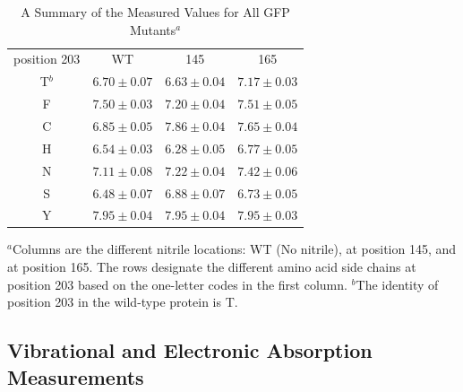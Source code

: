 \begin{table}
    \caption[Measure \pKa{} values of the GFP chromophore]{
        A Summary of the Measured \pKa{} Values for All GFP Mutants$^a$
    }
    \begin{center}
    \begin{tabular}{c|ccc}
        \toprule
        \rowcolor{lgray}
        position 203 & WT & \pCNF{} 145 & \pCNF{} 165 \\

        \cmidrule(r){1-1}\cmidrule(l){2-4}
        T$^b$ &   $ 6.70 \pm 0.07 $  &  $ 6.63 \pm 0.04 $ &  $ 7.17 \pm 0.03 $  \\
        F     &   $ 7.50 \pm 0.03 $  &  $ 7.20 \pm 0.04 $ &  $ 7.51 \pm 0.05 $  \\
        C     &   $ 6.85 \pm 0.05 $  &  $ 7.86 \pm 0.04 $ &  $ 7.65 \pm 0.04 $  \\
        H     &   $ 6.54 \pm 0.03 $  &  $ 6.28 \pm 0.05 $ &  $ 6.77 \pm 0.05 $  \\ 
        N     &   $ 7.11 \pm 0.08 $  &  $ 7.22 \pm 0.04 $ &  $ 7.42 \pm 0.06 $  \\ 
        S     &   $ 6.48 \pm 0.07 $  &  $ 6.88 \pm 0.07 $ &  $ 6.73 \pm 0.05 $  \\ 
        Y     &   $ 7.95 \pm 0.04 $  &  $ 7.95 \pm 0.04 $ &  $ 7.95 \pm 0.03 $  \\ 

        \bottomrule
    \end{tabular}
    \end{center}

    $^a$Columns are the different nitrile locations: WT (No nitrile), \pCNF{} at position 145, and \pCNF{} at position 165. The rows designate the different amino acid side chains at position 203 based on the one-letter codes in the first column. 
    $^b$The identity of position 203 in the wild-type protein is T.
    \label{tbl:pKas}
\end{table}

\subsection{Vibrational and Electronic Absorption Measurements}

